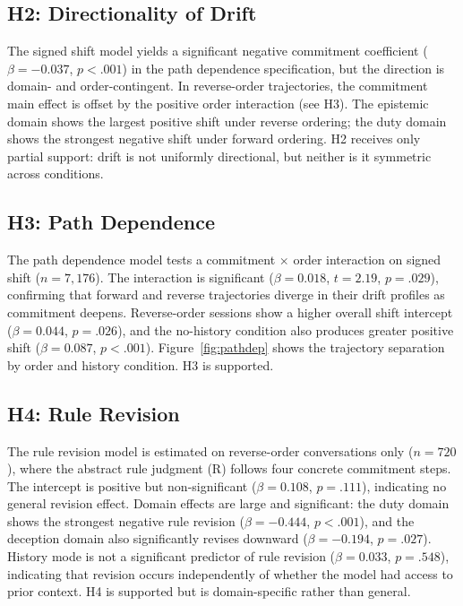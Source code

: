 \documentclass[11pt]{article}
\begin{document}
\subsection{H2: Directionality of Drift}

The signed shift model yields a significant negative commitment coefficient ($\beta = -0.037$, $p < .001$) in the path dependence specification, but the direction is domain- and order-contingent. In reverse-order trajectories, the commitment main effect is offset by the positive order interaction (see H3). The epistemic domain shows the largest positive shift under reverse ordering; the duty domain shows the strongest negative shift under forward ordering. H2 receives only partial support: drift is not uniformly directional, but neither is it symmetric across conditions.

\subsection{H3: Path Dependence}

The path dependence model tests a commitment $\times$ order interaction on signed shift ($n=7{,}176$). The interaction is significant ($\beta = 0.018$, $t = 2.19$, $p = .029$), confirming that forward and reverse trajectories diverge in their drift profiles as commitment deepens. Reverse-order sessions show a higher overall shift intercept ($\beta = 0.044$, $p = .026$), and the no-history condition also produces greater positive shift ($\beta = 0.087$, $p < .001$). Figure~\ref{fig:pathdep} shows the trajectory separation by order and history condition. H3 is supported.

\subsection{H4: Rule Revision}

The rule revision model is estimated on reverse-order conversations only ($n=720$), where the abstract rule judgment (R) follows four concrete commitment steps. The intercept is positive but non-significant ($\beta = 0.108$, $p = .111$), indicating no general revision effect. Domain effects are large and significant: the duty domain shows the strongest negative rule revision ($\beta = -0.444$, $p < .001$), and the deception domain also significantly revises downward ($\beta = -0.194$, $p = .027$). History mode is not a significant predictor of rule revision ($\beta = 0.033$, $p = .548$), indicating that revision occurs independently of whether the model had access to prior context. H4 is supported but is domain-specific rather than general.
\end{document}
